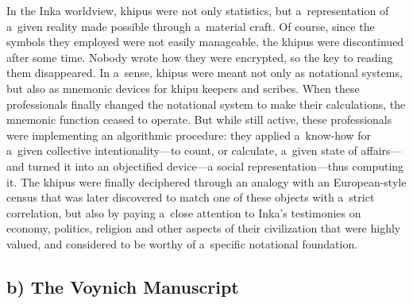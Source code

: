 In the Inka worldview, khipus were not only statistics, but a~representation of a~given reality made possible through a~material craft. Of course, since the symbols they employed were not easily manageable, the khipus were discontinued after some time. Nobody wrote how they were encrypted, so the key to reading them disappeared. In a~sense, khipus were meant not only as notational systems, but also as mnemonic devices for khipu keepers and scribes. When these professionals finally changed the notational system to make their calculations, the mnemonic function ceased to operate. But while still active, these professionals were implementing an algorithmic procedure: they applied a~know-how for a~given collective intentionality—to count, or calculate, a~given state of affairs—and turned it into an objectified device—a social representation—thus computing it. The khipus were finally deciphered through an analogy with an European-style census that was later discovered to match one of these objects with a~strict correlation, but also by paying a~close attention to Inka's testimonies on economy, politics, religion and other aspects of their civilization that were highly valued, and considered to be worthy of a~specific notational foundation.

\subsection*{b) The Voynich Manuscript}

